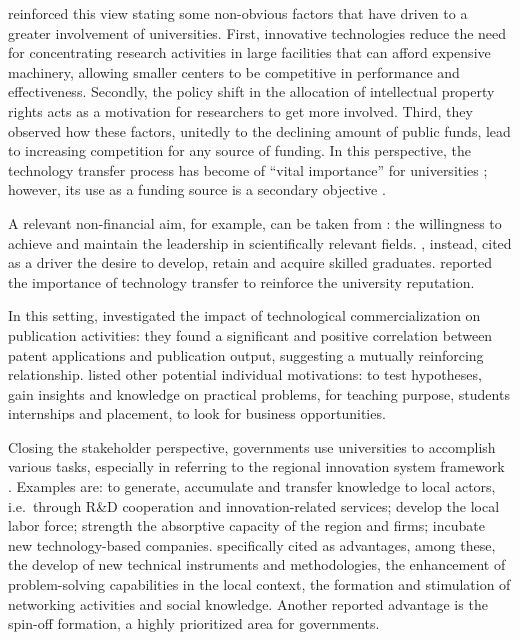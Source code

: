 \citet{Baldini2007} reinforced this view stating some non-obvious factors that have driven to a greater involvement of universities. First, innovative technologies reduce the need for concentrating research activities in large facilities that can afford expensive machinery, allowing smaller centers to be competitive in performance and effectiveness. Secondly, the policy shift in the allocation of intellectual property rights acts as a motivation for researchers to get more involved. Third, they observed how these factors, unitedly to the declining amount of public funds, lead to increasing competition for any source of funding. In this perspective, the technology transfer process has become of \enquote{vital importance} for universities \citep{Muscio2008}; however, its use as a funding source is a secondary objective \citep{Jensen1998}.

A relevant non-financial aim, for example, can be taken from \citet{Tijssen2006}: the willingness to achieve and maintain the leadership in scientifically relevant fields. \citet{Leitch2005}, instead, cited as a driver the desire to develop, retain and acquire skilled graduates. \citet{Baldini2006} reported the importance of technology transfer to reinforce the university reputation. 

In this setting, \citet{Wong2010} investigated the impact of technological commercialization on publication activities: they found a significant and positive correlation between patent applications and publication output, suggesting a mutually reinforcing relationship. \citet{Lee2000} listed other potential individual motivations: to test hypotheses, gain insights and knowledge on practical problems, for teaching purpose, students internships and placement, to look for business opportunities. 

Closing the stakeholder perspective, governments use universities to accomplish various tasks, especially in referring to the regional innovation system framework \citep{Fritsch2007,Balderi2007}. Examples are: to generate, accumulate and transfer knowledge to local actors, i.e.\ through R\&D cooperation and innovation-related services; develop the local labor force; strength the absorptive capacity of the region and firms; incubate new technology-based companies. \citet{AzagraCaro2010} specifically cited as advantages, among these, the develop of new technical instruments and methodologies, the enhancement of problem-solving capabilities in the local context, the formation and stimulation of networking activities and social knowledge. Another reported advantage is the spin-off formation, a highly prioritized area for governments.

